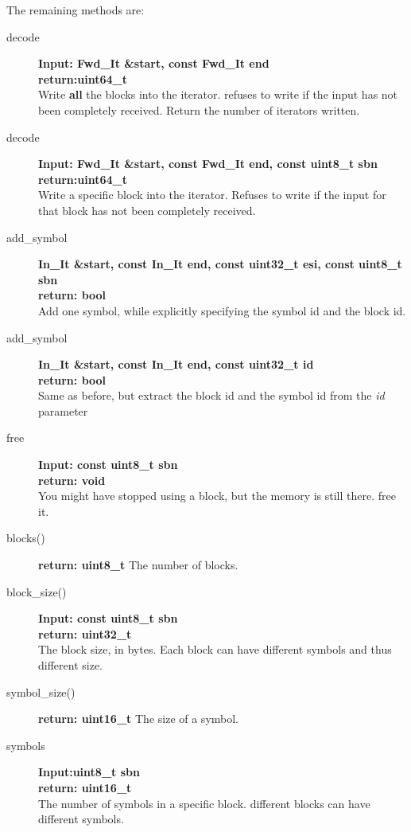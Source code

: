 \documentclass[11pt,a4paper]{refart}
\begin{document}
The remaining methods are:
\begin{description}
\item[decode]\textbf{Input: Fwd\_It \&start, const Fwd\_It end}\\
\textbf{return:uint64\_t}\\
Write \textbf{all} the blocks into the iterator. refuses to write if the input has not been completely received. Return the number of iterators written.

\item[decode]\textbf{Input: Fwd\_It \&start, const Fwd\_It end, const uint8\_t sbn}\\
\textbf{return:uint64\_t}\\
Write a specific block into the iterator. Refuses to write if the input for that block has not been completely received.

\item[add\_symbol]\textbf{In\_It \&start, const In\_It end, const uint32\_t esi, const uint8\_t sbn}\\
\textbf{return: bool}\\
Add one symbol, while explicitly specifying the symbol id and the block id.

\item[add\_symbol]\textbf{In\_It \&start, const In\_It end, const uint32\_t id}\\
\textbf{return: bool}\\
Same as before, but extract the block id and the symbol id from the \textit{id} parameter

\item[free]\textbf{Input: const uint8\_t sbn}\\
\textbf{return: void}\\
You might have stopped using a block, but the memory is still there. free it.

\item[blocks()] \textbf{return: uint8\_t} The number of blocks.

\item[block\_size()] \textbf{Input: const uint8\_t sbn}\\
\textbf{return: uint32\_t}\\
The block size, in bytes. Each block can have different symbols and thus different size.

\item[symbol\_size()] \textbf{return: uint16\_t} The size of a symbol.

\item[symbols] \textbf{Input:uint8\_t sbn}\\
\textbf{return: uint16\_t}\\
The number of symbols in a specific block. different blocks can have different symbols.
\end{description}
\newpage
\end{document}
